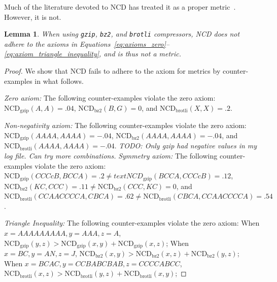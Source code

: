 \documentclass[preprint,12pt]{article}
\newcommand{\cm}[1]{\textit{{\color{blue}#1}}}
\newtheorem{lemma}{Lemma}
\begin{document}
Much of the literature devoted to NCD has treated it as a proper metric~\cite{opitz2023gzip,weinreich2023parameter,nishida2011tweet,jiang2022less}. However, it is not.
\begin{lemma}
    When using \texttt{gzip}, \texttt{bz2}, and \texttt{brotli} compressors, NCD does not adhere to the axioms in Equations~\ref{eq:axioms_zero}--\ref{eq:axiom_triangle_inequality}, and is thus not a metric.
\end{lemma}
\begin{proof}
    We show that NCD fails to adhere to the axiom for metrics by counter-examples in what follows.

    \vspace{0.5em}
    \noindent%
    \textit{Zero axiom:} The following counter-examples violate the zero axiom:
    $\text{NCD}_{\text{gzip}}(A,A) = .04$, $\text{NCD}_{\text{bz2}}(B,G) = 0 $, and $\text{NCD}_{\text{brotli}}(X,X) = .2$.

    \vspace{0.5em}
    \noindent%
    \textit{Non-negativity axiom:} The following counter-examples violate the zero axiom:
    $\text{NCD}_{\text{gzip}}(AAAA,AAAA) = -.04$, $\text{NCD}_{\text{bz2}}(AAAA,AAAA) = -.04$, and $\text{NCD}_{\text{brotli}}(AAAA,AAAA) = -.04$.
    \cm{TODO: Only gzip had negative values in my log file. Can try more combinations.}
    \vspace{0.5em}
    \noindent%
    \textit{Symmetry axiom:} The following counter-examples violate the zero axiom:
    $\text{NCD}_{\text{gzip}}(CCCcB, BCCA) = .2 \neq text{NCD}_{\text{gzip}}(BCCA, CCCcB)=.12$, $\text{NCD}_{\text{bz2}}(KC, CCC) = .11 \neq \text{NCD}_{\text{bz2}}(CCC, KC) = 0 $, and $\text{NCD}_{\text{brotli}}(CCAACCCCA, CBCA) = .62 \neq \text{NCD}_{\text{brotli}}(CBCA, CCAACCCCA) = .54$.

    \vspace{0.5em}
    \noindent%
    \textit{Triangle Inequality:} The following counter-examples violate the zero axiom: When $x= AAAAAAAAA, y=AAA, z=A$, $\text{NCD}_{\text{gzip}}(y,z) > \text{NCD}_{\text{gzip}}(x,y) + \text{NCD}_{\text{gzip}}(x,z)$; When $x= BC, y=AN, z=J$, $\text{NCD}_{\text{bz2}}(x,y) > \text{NCD}_{\text{bz2}}(x,z) + \text{NCD}_{\text{bz2}}(y,z)$; When $x= BCAC, y=CCBABCBAB, z=CCCCABCC$, $\text{NCD}_{\text{brotli}}(x,z) > \text{NCD}_{\text{brotli}}(y,z) + \text{NCD}_{\text{brotli}}(x,y)$;
    
\end{proof}

\end{document}
